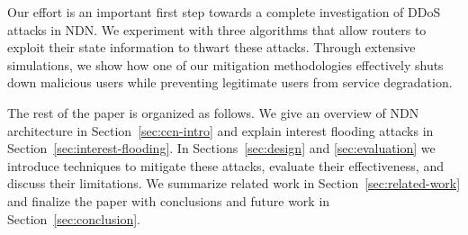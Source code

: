 Our effort is an important first step towards a complete investigation of DDoS attacks in NDN. We experiment with three algorithms that allow routers to exploit their state information to thwart these attacks. Through extensive simulations, we show how one of our mitigation methodologies effectively shuts down malicious users while preventing legitimate users from service degradation. 

The rest of the paper is organized as follows. We give an overview of NDN architecture in Section~\ref{sec:ccn-intro} and explain interest flooding attacks in Section~\ref{sec:interest-flooding}. In Sections~\ref{sec:design} and \ref{sec:evaluation} we introduce techniques to mitigate these attacks, evaluate their effectiveness, and discuss their limitations. We summarize related work in Section~\ref{sec:related-work} and finalize the paper with conclusions and future work in Section~\ref{sec:conclusion}.




